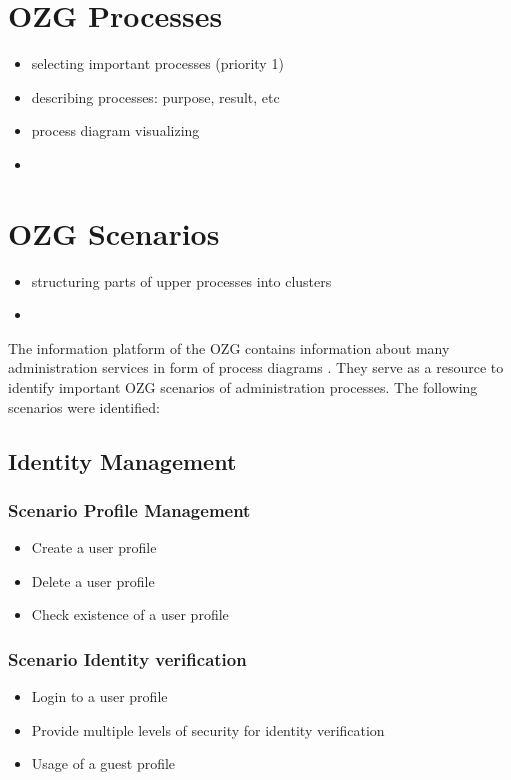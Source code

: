 \documentclass[
     12pt,         %
     a4paper,      %
     BCOR=10mm,version=first,     %
     DIV=14,version=first,        %
     ]{scrreprt}
\begin{document}
\section{OZG Processes}

\begin{itemize}
    \item selecting important processes (priority 1)
    \item describing processes: purpose, result, etc
    \item process diagram visualizing
    \item 
\end{itemize}

\section{OZG Scenarios}

\begin{itemize}
    \item structuring parts of upper processes into clusters
    \item 
\end{itemize}

The information platform of the OZG contains information about many administration services in form of process diagrams \cite{BMI:Ergebnisse}. They serve as a resource to identify important OZG scenarios of administration processes. The following scenarios were identified:

\subsection{Identity Management}

\subsubsection{Scenario Profile Management}
\begin{itemize}
    \item Create a user profile
    \item Delete a user profile
    \item Check existence of a user profile
\end{itemize}

\subsubsection{Scenario Identity verification}
\begin{itemize}
    \item Login to a user profile
    \item Provide multiple levels of security for identity verification
    \item Usage of a guest profile
\end{itemize}
\end{document}
